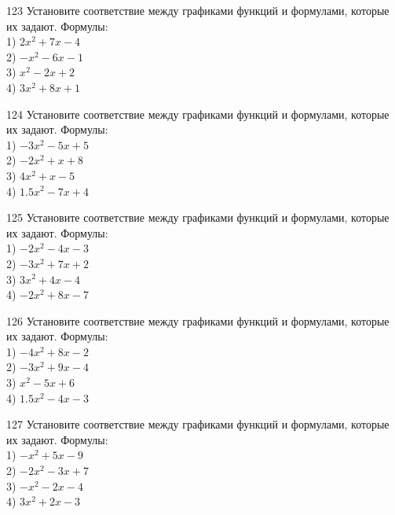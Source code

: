 \documentclass[4apaper]{article}
\begin{document}
\begin{taskBN}{123}
Установите соответствие между графиками функций и формулами, которые их задают. Формулы: \\1) $2x^2+7x-4$\\2) $-x^2-6x-1$\\3) $x^2-2x+2$\\4) $3x^2+8x+1$
\end{taskBN}

\begin{taskBN}{124}
Установите соответствие между графиками функций и формулами, которые их задают. Формулы: \\1) $-3x^2-5x+5$\\2) $-2x^2+x+8$\\3) $4x^2+x-5$\\4) $1.5x^2-7x+4$
\end{taskBN}

\begin{taskBN}{125}
Установите соответствие между графиками функций и формулами, которые их задают. Формулы: \\1) $-2x^2-4x-3$\\2) $-3x^2+7x+2$\\3) $3x^2+4x-4$\\4) $-2x^2+8x-7$
\end{taskBN}

\begin{taskBN}{126}
Установите соответствие между графиками функций и формулами, которые их задают. Формулы: \\1) $-4x^2+8x-2$\\2) $-3x^2+9x-4$\\3) $x^2-5x+6$\\4) $1.5x^2-4x-3$
\end{taskBN}

\begin{taskBN}{127}
Установите соответствие между графиками функций и формулами, которые их задают. Формулы: \\1) $-x^2+5x-9$\\2) $-2x^2-3x+7$\\3) $-x^2-2x-4$\\4) $3x^2+2x-3$
\end{taskBN}
\end{document}
